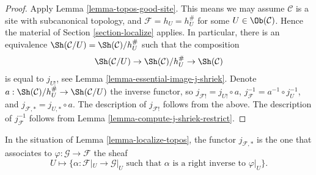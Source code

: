 \begin{proof}
Apply
Lemma \ref{lemma-topos-good-site}.
This means we may assume $\mathcal{C}$ is a site
with subcanonical topology, and $\mathcal{F} = h_U = h_U^\#$
for some $U \in \Ob(\mathcal{C})$.
Hence the material of
Section \ref{section-localize}
applies. In particular, there is an equivalence
$\Sh(\mathcal{C}/U) = \Sh(\mathcal{C})/h_U^\#$
such that the composition
$$
\Sh(\mathcal{C}/U)
\to
\Sh(\mathcal{C})/h_U^\#
\to \Sh(\mathcal{C})
$$
is equal to $j_{U!}$, see
Lemma \ref{lemma-essential-image-j-shriek}.
Denote
$a : \Sh(\mathcal{C})/h_U^\# \to \Sh(\mathcal{C}/U)$
the inverse functor, so $j_{\mathcal{F}!} = j_{U!} \circ a$,
$j_\mathcal{F}^{-1} = a^{-1} \circ j_U^{-1}$, and
$j_{\mathcal{F}, *} = j_{U, *} \circ a$. The description of
$j_{\mathcal{F}!}$ follows from the above. The description of
$j_\mathcal{F}^{-1}$ follows from
Lemma \ref{lemma-compute-j-shriek-restrict}.
\end{proof}

\begin{lemma}
\label{lemma-localize-pushforward}
In the situation of Lemma \ref{lemma-localize-topos}, the functor
$j_{\mathcal{F}, *}$ is the one that associates to
$\varphi : \mathcal{G} \to \mathcal{F}$ the sheaf
$$
U
\longmapsto
\{\alpha : \mathcal{F}|_U \to \mathcal{G}|_U
\text{ such that } \alpha \text{ is a right inverse to }\varphi|_U \}.
$$
\end{lemma}

